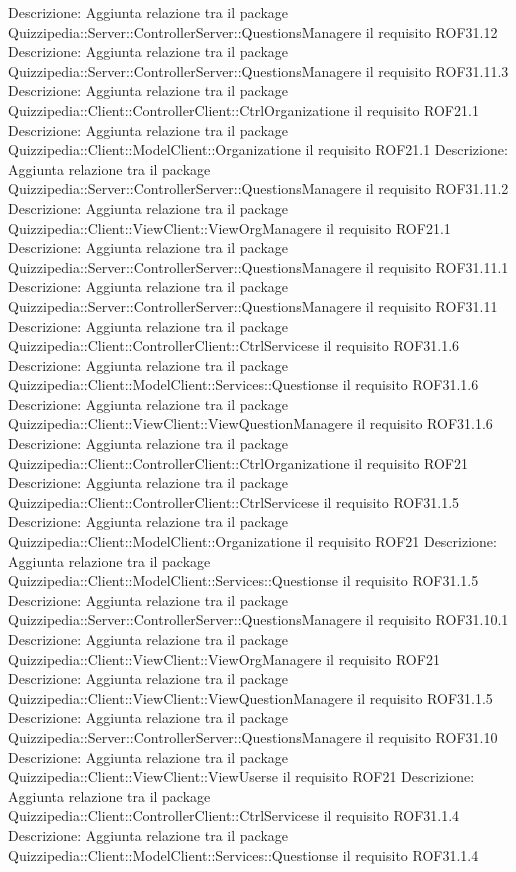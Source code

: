 Descrizione: Aggiunta relazione tra il package Quizzipedia::Server::ControllerServer::QuestionsManagere il requisito ROF31.12 
Descrizione: Aggiunta relazione tra il package Quizzipedia::Server::ControllerServer::QuestionsManagere il requisito ROF31.11.3 
Descrizione: Aggiunta relazione tra il package Quizzipedia::Client::ControllerClient::CtrlOrganizatione il requisito ROF21.1 
Descrizione: Aggiunta relazione tra il package Quizzipedia::Client::ModelClient::Organizatione il requisito ROF21.1 
Descrizione: Aggiunta relazione tra il package Quizzipedia::Server::ControllerServer::QuestionsManagere il requisito ROF31.11.2 
Descrizione: Aggiunta relazione tra il package Quizzipedia::Client::ViewClient::ViewOrgManagere il requisito ROF21.1 
Descrizione: Aggiunta relazione tra il package Quizzipedia::Server::ControllerServer::QuestionsManagere il requisito ROF31.11.1 
Descrizione: Aggiunta relazione tra il package Quizzipedia::Server::ControllerServer::QuestionsManagere il requisito ROF31.11 
Descrizione: Aggiunta relazione tra il package Quizzipedia::Client::ControllerClient::CtrlServicese il requisito ROF31.1.6 
Descrizione: Aggiunta relazione tra il package Quizzipedia::Client::ModelClient::Services::Questionse il requisito ROF31.1.6 
Descrizione: Aggiunta relazione tra il package Quizzipedia::Client::ViewClient::ViewQuestionManagere il requisito ROF31.1.6 
Descrizione: Aggiunta relazione tra il package Quizzipedia::Client::ControllerClient::CtrlOrganizatione il requisito ROF21 
Descrizione: Aggiunta relazione tra il package Quizzipedia::Client::ControllerClient::CtrlServicese il requisito ROF31.1.5 
Descrizione: Aggiunta relazione tra il package Quizzipedia::Client::ModelClient::Organizatione il requisito ROF21 
Descrizione: Aggiunta relazione tra il package Quizzipedia::Client::ModelClient::Services::Questionse il requisito ROF31.1.5 
Descrizione: Aggiunta relazione tra il package Quizzipedia::Server::ControllerServer::QuestionsManagere il requisito ROF31.10.1 
Descrizione: Aggiunta relazione tra il package Quizzipedia::Client::ViewClient::ViewOrgManagere il requisito ROF21 
Descrizione: Aggiunta relazione tra il package Quizzipedia::Client::ViewClient::ViewQuestionManagere il requisito ROF31.1.5 
Descrizione: Aggiunta relazione tra il package Quizzipedia::Server::ControllerServer::QuestionsManagere il requisito ROF31.10 
Descrizione: Aggiunta relazione tra il package Quizzipedia::Client::ViewClient::ViewUserse il requisito ROF21 
Descrizione: Aggiunta relazione tra il package Quizzipedia::Client::ControllerClient::CtrlServicese il requisito ROF31.1.4 
Descrizione: Aggiunta relazione tra il package Quizzipedia::Client::ModelClient::Services::Questionse il requisito ROF31.1.4 
